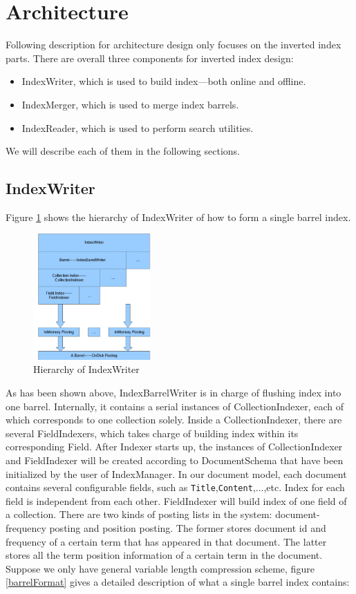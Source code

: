 \section{Architecture}
Following description for architecture design only focuses on the inverted index parts. There are overall three components for inverted index design:
\begin{itemize}
 \item IndexWriter, which is used to build index---both online and offline.
 \item IndexMerger, which is used to merge index barrels.
 \item IndexReader, which is used to perform search utilities.
\end{itemize}
We will describe each of them in the following sections.


\subsection{IndexWriter}

Figure \ref{indexWriter} shows the hierarchy of IndexWriter of how to form a single barrel index. 

\begin{figure}[h!]
\centerline{\includegraphics[width=0.4\textwidth]{Figures/indexWriter.jpg}}
\caption{Hierarchy of IndexWriter}\label{indexWriter}
\end{figure}


\par
As has been shown above, IndexBarrelWriter is in charge of flushing index into one barrel. Internally, it contains a serial instances of CollectionIndexer, each of which corresponds to one collection solely. Inside a CollectionIndexer, there are several FieldIndexers, which takes charge of building index within its corresponding Field. After Indexer starts up, the instances of CollectionIndexer and FieldIndexer will be created according to DocumentSchema that have been initialized by the user of IndexManager. In our document model, each document contains several configurable fields, such as \texttt{Title},\texttt{Content},...,etc. Index for each field is independent from each other.  FieldIndexer will build index of one field
of a collection. There are two kinds of posting lists in the system: document-frequency posting and position posting. The former stores document id and frequency of a certain term that has appeared in that document. The latter stores all the term position information of a certain term in the document. 
Suppose we only have general variable length compression scheme, figure \ref{barrelFormat} gives a detailed description of what a single barrel index contains:

